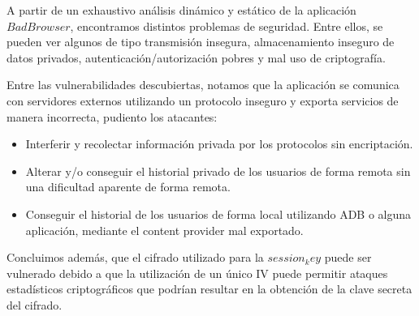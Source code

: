 \documentclass[10pt, a4paper]{article}
\begin{document}
A partir de un exhaustivo análisis dinámico y estático de la aplicación $BadBrowser$, encontramos distintos problemas de seguridad. Entre ellos, se pueden ver algunos de tipo transmisión insegura, almacenamiento inseguro de datos privados, autenticación/autorización pobres y mal uso de criptografía. 

Entre las vulnerabilidades descubiertas, notamos que la aplicación se comunica con servidores externos utilizando un protocolo inseguro y exporta servicios de manera incorrecta, pudiento los atacantes:
\begin{itemize}
\item Interferir y recolectar información privada por los protocolos sin encriptación.
\item Alterar y/o conseguir el historial privado de los usuarios de forma remota sin una dificultad aparente de forma remota.
\item Conseguir el historial de los usuarios de forma local utilizando ADB o alguna aplicación, mediante el content provider mal exportado.
\end{itemize}

Concluimos además, que el cifrado utilizado para la $session_key$ puede ser vulnerado debido a que la utilización de un único IV puede permitir ataques estadísticos criptográficos que podrían resultar en la obtención de la clave secreta del cifrado.
\end{document}
